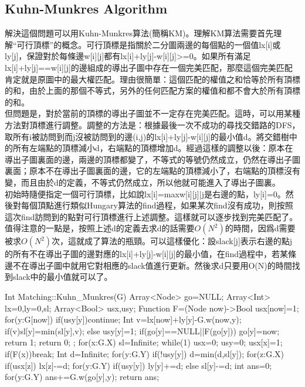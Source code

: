 \documentclass{article}
\begin{document}
\subsection{Kuhn-Munkres Algorithm}
解決這個問題可以用Kuhn-Munkres算法(簡稱KM)。理解KM算法需要首先理解“可行頂標”的概念。可行頂標是指關於二分圖兩邊的每個點的一個值lx[i]或ly[j]，保證對於每條邊w[i][j]都有lx[i]+ly[j]-w[i][j]>=0。如果所有滿足lx[i]+ly[j]==w[i][j]的邊組成的導出子圖中存在一個完美匹配，那麼這個完美匹配肯定就是原圖中的最大權匹配。理由很簡單：這個匹配的權值之和恰等於所有頂標的和，由於上面的那個不等式，另外的任何匹配方案的權值和都不會大於所有頂標的和。\\
但問題是，對於當前的頂標的導出子圖並不一定存在完美匹配。這時，可以用某種方法對頂標進行調整。調整的方法是：根據最後一次不成功的尋找交錯路的DFS，取所有i被訪問到而j沒被訪問到的邊(i,j)的lx[i]+ly[j]-w[i][j]的最小值d。將交錯樹中的所有左端點的頂標減小d，右端點的頂標增加d。經過這樣的調整以後：原本在導出子圖裏面的邊，兩邊的頂標都變了，不等式的等號仍然成立，仍然在導出子圖裏面；原本不在導出子圖裏面的邊，它的左端點的頂標減小了，右端點的頂標沒有變，而且由於d的定義，不等式仍然成立，所以他就可能進入了導出子圖裏。\\
初始時隨便指定一個可行頂標，比如說lx[i]=max{w[i][j]|j是右邊的點}，ly[i]=0。然後對每個頂點進行類似Hungary算法的find過程，如果某次find沒有成功，則按照這次find訪問到的點對可行頂標進行上述調整。這樣就可以逐步找到完美匹配了。\\
值得注意的一點是，按照上述d的定義去求d的話需要$O(N^2)$的時間，因爲d需要被求$O(N^2)$次，這就成了算法的瓶頸。可以這樣優化：設slack[j]表示右邊的點j的所有不在導出子圖的邊對應的lx[i]+ly[j]-w[i][j]的最小值，在find過程中，若某條邊不在導出子圖中就用它對相應的slack值進行更新。然後求d只要用O(N)的時間找到slack中的最小值就可以了。\\
\begin{algorithm}[caption={Kuhn–Munkres Algorithm}, label={alg1}]
Int Matching::Kuhn_Munkres(G)
    Array<Node> go=NULL;
    Array<Int> lx=0,ly=0,sl;
    Array<Bool> usx,usy;
    Function F=(Node now)->Bool{
        usx[now]=1;
        for(y:G[now])
            if(usy[y])continue;
            Int v=lx[now]+ly[y]-G.w(now,y);
            if(v)sl[y]=min(sl[y],v);
            else
                usy[y]=1;
                if(go[y]==NULL||F(go[y]))
                    go[y]=now;
                    return 1;
        return 0;
        };
    for(x:G.X)
        sl=Infinite;
        while(1)
            usx=0;
            usy=0;
            usx[x]=1;
            if(F(x))break;
            Int d=Infinite;
            for(y:G.Y)
                if(!usy[y])
                    d=min(d,sl[y]);
            for(z:G.X)
                if(usx[z])
                    lx[z]-=d;
            for(y:G.Y)
                if(usy[y])
                    ly[y]+=d;
                else
                    sl[y]-=d;
    int ans=0;
    for(y:G.Y)
        ans+=G.w(go[y],y);
    return ans;
\end{algorithm}             
\end{document}
